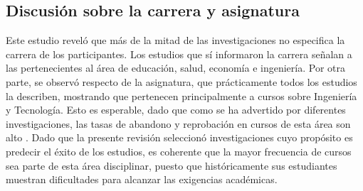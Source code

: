\documentclass[spanish]{textolivre}
\begin{document}
\subsection*{Discusión sobre la carrera y asignatura}
Este estudio reveló que más de la mitad de las investigaciones no especifica la carrera de los participantes. Los estudios que sí informaron la carrera señalan a las pertenecientes al área de educación, salud, economía e ingeniería. Por otra parte, se observó respecto de la asignatura, que prácticamente todos los estudios la describen, mostrando que pertenecen principalmente a cursos sobre Ingeniería y Tecnología. Esto es esperable, dado que como se ha advertido por diferentes investigaciones, las tasas de abandono y reprobación en cursos de esta área son alto \cite{lazaro_alvarez2020}. Dado que la presente revisión seleccionó investigaciones cuyo propósito es predecir el éxito de los estudios, es coherente que la mayor frecuencia de cursos sea parte de esta área disciplinar, puesto que históricamente sus estudiantes muestran dificultades para alcanzar las exigencias académicas.
\end{document}
